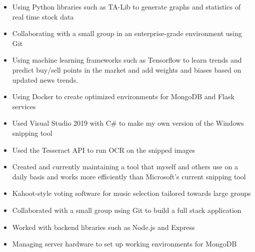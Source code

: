 \documentclass[10pt,a4paper,ragged2e]{altacv}
\begin{document}

\begin{fullwidth}
\makecvheader
\end{fullwidth}


\begin{itemize}
\item Using Python libraries such as TA-Lib to generate graphs and statistics of real time stock data
\smallskip
\item Collaborating with a small group in an enterprise-grade environment using Git
\smallskip
\item Using machine learning frameworks such as Tensorflow to learn trends and predict buy/sell points in the market and add weights and biases based on updated news trends.
\smallskip
\item Using Docker to create optimized environments for MongoDB and Flask services
\end{itemize}
\smallskip
\smallskip
{}
\begin{itemize}
\item Used Visual Studio 2019 with C\# to make my own version of the Windows snipping tool
\smallskip
\item Used the Tesseract API to run OCR on the snipped images
\smallskip
\item Created and currently maintaining a tool that myself and others use on a daily basis and works more efficiently than Microsoft's current snipping tool
\end{itemize}
\smallskip
\smallskip
{}
\begin{itemize}
\item Kahoot-style voting software for music selection tailored towards large groups
\smallskip
\item Collaborated with a small group using Git to build a full stack application
\smallskip
\item Worked with backend libraries such as Node.js and Express
\smallskip
\item Managing server hardware to set up working environments for MongoDB
\end{itemize}
\end{document}
